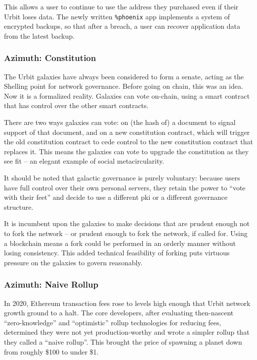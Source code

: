 \documentclass[twoside]{article}
\begin{document}
This allows a user to continue to use the address they purchased even if their Urbit loses data.  The newly written \lstinline[style=inlinecode]{%phoenix} app implements a system of encrypted backups, so that after a breach, a user can recover application data from the latest backup.

\subsubsection{Azimuth: Constitution}

The Urbit galaxies have always been considered to form a senate, acting as the Shelling point for network governance.  Before going on chain, this was an idea.  Now it is a formalized reality.  Galaxies can vote on-chain, using a smart contract that has control over the other smart contracts.

There are two ways galaxies can vote: on (the hash of) a document to signal support of that document, and on a new constitution contract, which will trigger the old constitution contract to cede control to the new constitution contract that replaces it.  This means the galaxies can vote to upgrade the constitution as they see fit – an elegant example of social metacircularity.

It should be noted that galactic governance is purely voluntary: because users have full control over their own personal servers, they retain the power to ``vote with their feet'' and decide to use a different {\sc pki} or a different governance structure.

It is incumbent upon the galaxies to make decisions that are prudent enough not to fork the network – or prudent enough to fork the network, if called for.  Using a blockchain means a fork could be performed in an orderly manner without losing consistency.  This added technical feasibility of forking puts virtuous pressure on the galaxies to govern reasonably.

\subsubsection{Azimuth: Naive Rollup}

In 2020, Ethereum transaction fees rose to levels high enough that Urbit network growth ground to a halt.  The core developers, after evaluating then-nascent ``zero-knowledge'' and ``optimistic'' rollup technologies for reducing fees, determined they were not yet production-worthy and wrote a simpler rollup that they called a ``naive rollup''.  This brought the price of spawning a planet down from roughly \$100 to under \$1.
\end{document}
